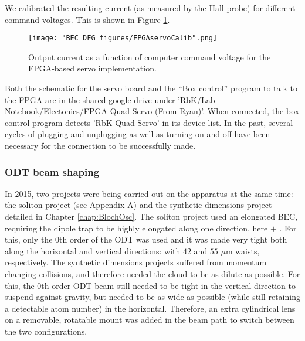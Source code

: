 We calibrated the resulting current (as measured by the Hall probe) for different command voltages. This is shown in Figure \ref{fig:FPGAservoCalib}. 
\begin{figure}
	\texttt{[image: "BEC\_DFG figures/FPGAservoCalib".png]}
\caption[Output current as a function of computer command voltage]{Output current as a function of computer command voltage for the FPGA-based servo implementation. }
\label{fig:FPGAservoCalib}
\end{figure}
Both the schematic for the servo board and the “Box control” program to talk to the FPGA are in the shared google drive under 'RbK/Lab Notebook/Electonics/FPGA Quad Servo (From Ryan)'. When connected, the box control program detects 'RbK Quad Servo' in its device list. In the past, several cycles of plugging and unplugging as well as turning on and off have been necessary for the connection to be successfully made.
\subsubsection{ODT beam shaping}\label{sec:ODTbeamShape}

In 2015, two projects were being carried out on the apparatus at the same time: the soliton project (see Appendix A)\cite{Aycock2017} and the synthetic dimensions project detailed in Chapter \ref{chap:BlochOsc}. The soliton project used an elongated BEC, requiring the dipole trap to be highly elongated along one direction, here \ex{} $+$ \ey{}. For this, only the 0th order of the ODT was used and it was made very tight both along the horizontal and vertical directions: with $42$ and $55$ $\mu$m waists, respectively. The synthetic dimensions projects suffered from momentum changing collisions, and therefore needed the cloud to be as dilute as possible. For this, the 0th order ODT beam still needed to be tight in the vertical direction to suspend against gravity, but needed to be as wide as possible (while still retaining a detectable atom number) in the horizontal. Therefore, an extra cylindrical lens on a removable, rotatable mount was added in the beam path to switch between the two configurations. 


